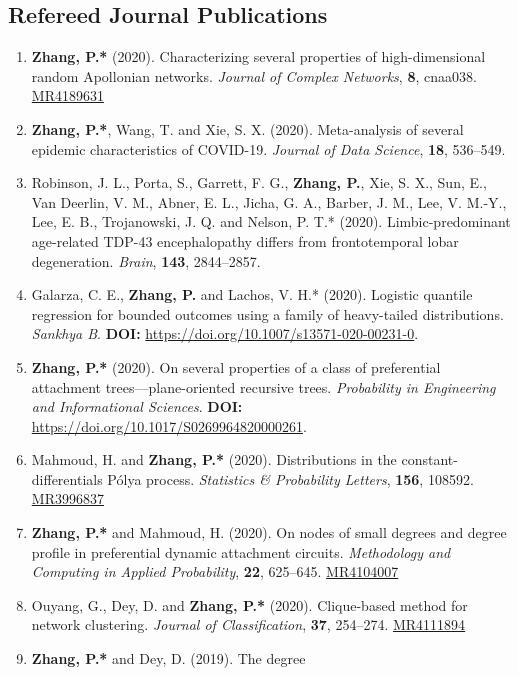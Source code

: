 \documentclass[margin]{res}
\def\MR#1{\href{http://www.ams.org/mathscinet-getitem?mr=#1}{MR#1}}
\begin{document}
\begin{resume}
\subsection{Refereed Journal Publications}
\begin{enumerate}
	\item {\sc \bf Zhang, P.*} (2020). Characterizing several 
	properties of high-dimensional random Apollonian networks. {\em 
	Journal of Complex Networks}, {\bf 8}, cnaa038. \MR{4189631}
	\item {\sc \bf Zhang, P.*}, {\sc Wang, T.} and {\sc Xie, S. X.} 
	(2020). Meta-analysis of several epidemic characteristics of 
	COVID-19. {\em Journal of Data Science}, {\bf 18}, 536--549.
	\item {\sc Robinson, J. L., Porta, S., Garrett, F. G.}, {\sc \bf 
	Zhang, P.}, {\sc Xie, S. X., Sun, E., Van Deerlin, V. M., Abner, 
	E. L., Jicha, G. A., Barber, J. M., Lee, V. M.-Y., Lee, E. B., 
	Trojanowski, J. Q.} and {\sc Nelson, P. T.*} (2020). 
	Limbic-predominant age-related TDP-43 encephalopathy differs 
	from frontotemporal lobar degeneration. {\em Brain}, {\bf 143}, 
	2844--2857.
	\item {\sc Galarza, C. E.}, {\sc \bf Zhang, P.} and {\sc Lachos, 
	V. H.*} (2020). Logistic quantile regression for bounded 
	outcomes 
	using a family of heavy-tailed distributions. {\em Sankhya B}. 
	\textbf{DOI:} \url{https://doi.org/10.1007/s13571-020-00231-0}.
	\item {\sc \bf Zhang, P.*} (2020). On several properties of a 
	class of preferential attachment trees---plane-oriented 
	recursive trees. {\em Probability in Engineering and 
	Informational Sciences}. 
	\textbf{DOI:} \url{https://doi.org/10.1017/S0269964820000261}.
	\item {\sc Mahmoud, H.} and {\sc \bf Zhang, P.*} (2020). 
	Distributions in the constant-differentials P\'{o}lya process. 
	{\em Statistics \& Probability Letters}, \textbf{156}, 108592. 
	\MR{3996837}
	\item {\sc \bf Zhang, P.*} and {\sc Mahmoud, H.} (2020). On 
	nodes of small degrees and degree profile in preferential 
	dynamic attachment circuits. {\em Methodology and Computing in 
	Applied Probability}, \textbf{22}, 625--645. \MR{4104007}
	\item {\sc Ouyang, G., Dey, D.} and {\sc \bf Zhang, P.*} (2020). 
	Clique-based method for network clustering. {\em Journal of 
	Classification}, \textbf{37}, 254--274. \MR{4111894}
	\item {\sc \bf Zhang, P.*} and {\sc Dey, D.} (2019). The degree 

\end{enumerate}
\end{resume}
\end{document}
